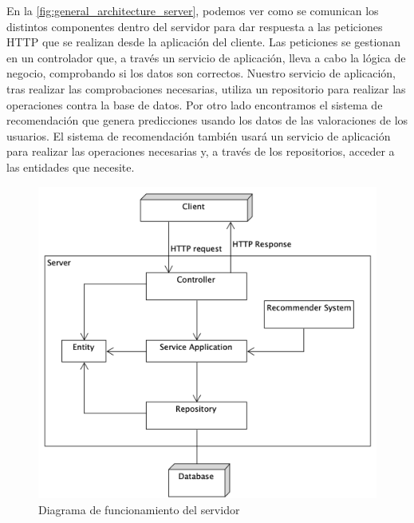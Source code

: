  En la \autoref{fig:general_architecture_server}, podemos ver como se comunican
 los distintos componentes dentro del servidor para dar respuesta a las peticiones
 HTTP que se realizan desde la aplicación del cliente.
Las peticiones se gestionan en un controlador que, a través un servicio de
 aplicación, lleva a cabo la lógica de negocio, comprobando si los datos son correctos.  
 Nuestro servicio de aplicación, tras realizar las comprobaciones necesarias, utiliza un 
 repositorio para realizar las operaciones contra la base de datos. Por otro lado encontramos 
 el sistema de recomendación que genera predicciones usando los datos de las valoraciones de los usuarios. 
 El sistema de recomendación también usará un servicio de aplicación para realizar las operaciones necesarias y, 
 a través de los repositorios, acceder a las entidades que necesite. 
\begin{figure}[H]
    \centering
    \includegraphics[width=6in]{figures/chapter-4/general_server_architecture.png}
    \caption{Diagrama de funcionamiento del servidor}
    \label{fig:general_architecture_server}
\end{figure}
